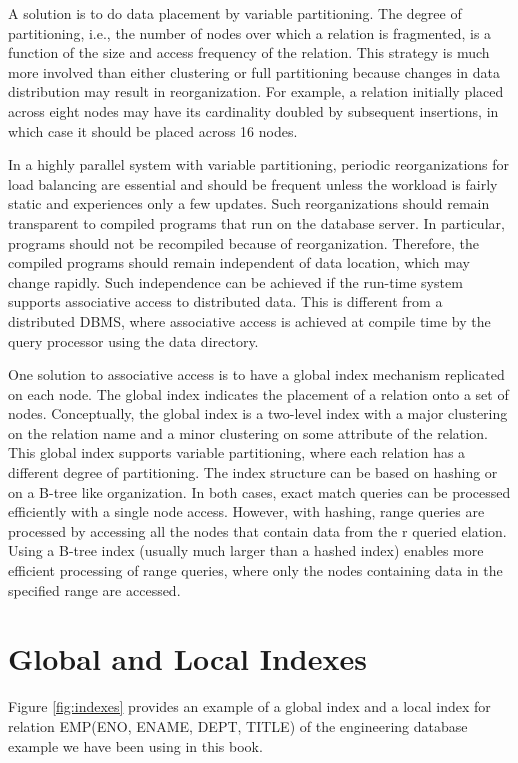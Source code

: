 \documentclass{vldb}
\begin{document}
A solution is to do data placement by variable partitioning. The degree of partitioning, i.e., the number of nodes over which a relation is fragmented, is a function of the size and access frequency of the relation. This strategy is much more involved than either clustering or full partitioning because changes in data distribution may result in reorganization. For example, a relation initially placed across eight nodes may have its cardinality doubled by subsequent insertions, in which case it should be placed across 16 nodes.

In a highly parallel system with variable partitioning, periodic reorganizations for load balancing are essential and should be frequent unless the workload is fairly static and experiences only a few updates. Such reorganizations should remain transparent to compiled programs that run on the database server. In particular, programs should not be recompiled because of reorganization. Therefore, the compiled programs should remain independent of data location, which may change rapidly. Such independence can be achieved if the run-time system supports associative access to distributed data. This is different from a distributed DBMS, where associative access is achieved at compile time by the query processor using the data directory.

One solution to associative access is to have a global index mechanism replicated on each node. The global index indicates the placement of a relation onto a set of nodes. Conceptually, the global index is a two-level index with a major clustering on the relation name and a minor clustering on some attribute of the relation. This global index supports variable partitioning, where each relation has a different degree of partitioning. The index structure can be based on hashing or on a B-tree like organization. In both cases, exact match queries can be processed efficiently with a single node access. However, with hashing, range queries are processed by accessing all the nodes that contain data from the r queried elation. Using a B-tree index (usually much larger than a hashed index) enables more efficient processing of range queries, where only the nodes containing data in the specified range are accessed.

\section{Global and Local Indexes}
Figure \ref{fig:indexes} provides an example of a global index and a local index for relation EMP(ENO, ENAME, DEPT, TITLE) of the engineering database example we have been using in this book.
\end{document}
